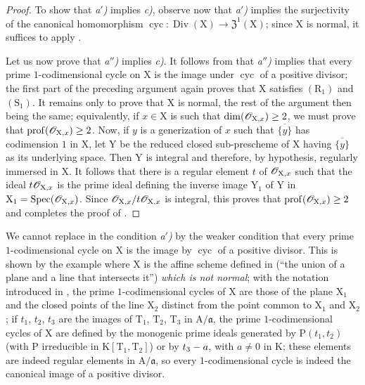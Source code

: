 \begin{proof}
To show that \emph{a$'$)} implies \emph{c)}, observe now that \emph{a$'$)} implies the surjectivity of the canonical homomorphism $\operatorname{cyc}:\operatorname{Div}(\mathrm{X})\to\mathfrak{Z}^1(\mathrm{X})$; since $\mathrm{X}$ is normal, it suffices to apply .

Let us now prove that \emph{a$''$)} implies \emph{c)}.
It follows from  that \emph{a$''$)} implies that every prime $1$-codimensional cycle on $\mathrm{X}$ is the image under $\operatorname{cyc}$ of a positive divisor; the first part of the preceding argument again proves that $\mathrm{X}$ satisfies $(\mathrm{R}_1)$ and $(\mathrm{S}_1)$.
It remains only to prove that $\mathrm{X}$ is normal, the rest of the argument then being the same; equivalently, if $x\in\mathrm{X}$ is such that $\dim(\mathscr{O}_{\mathrm{X},x})\geq 2$, we must prove that $\operatorname{prof}(\mathscr{O}_{\mathrm{X},x})\geq 2$.
Now, if $y$ is a generization of $x$ such that $\overline{\{y\}}$ has codimension $1$ in $\mathrm{X}$, let $\mathrm{Y}$ be the reduced closed sub-prescheme of $\mathrm{X}$ having $\overline{\{y\}}$ as its
underlying space.
Then $\mathrm{Y}$ is integral and therefore, by hypothesis, regularly immersed in $\mathrm{X}$.
It follows that there is a regular element $t$ of $\mathscr{O}_{\mathrm{X},x}$ such that the ideal $t\mathscr{O}_{\mathrm{X},x}$ is the prime ideal defining the inverse image $\mathrm{Y}_1$ of $\mathrm{Y}$ in $\mathrm{X}_1=\operatorname{Spec}(\mathscr{O}_{\mathrm{X},x})$.
Since $\mathscr{O}_{\mathrm{X},x}/t\mathscr{O}_{\mathrm{X},x}$ is integral, this proves that $\operatorname{prof}(\mathscr{O}_{\mathrm{X},x})\geq 2$ and completes the proof of .
\end{proof}

\begin{remark}[21.7.5]
\label{IV.21.7.5}
We cannot replace in  the condition \emph{a$'$)} by the weaker condition that every prime $1$-codimensional cycle on $\mathrm{X}$ is the image by $\operatorname{cyc}$ of a positive divisor.
This is shown by the example where $\mathrm{X}$ is the affine scheme defined in  (``the union of a plane and a line that intersects it'') \emph{which is not normal};
with the notation introduced in , the prime $1$-codimensional cycles of $\mathrm{X}$ are those of the plane $\mathrm{X}_1$ and the closed points of the line $\mathrm{X}_2$ distinct from the point common to $\mathrm{X}_1$ and $\mathrm{X}_2$;
if $t_1$, $t_2$, $t_3$ are the images of $\mathrm{T}_1$, $\mathrm{T}_2$, $\mathrm{T}_3$ in $\mathrm{A}/\mathfrak{a}$, the prime $1$-codimensional cycles of $\mathrm{X}$ are defined by the monogenic prime ideals generated by $\mathrm{P}(t_1,t_2)$ (with $\mathrm{P}$ irreducible in $\mathrm{K}[\mathrm{T}_1,\mathrm{T}_2]$) or by $t_3- a$, with $a\neq 0$ in $\mathrm{K}$;
these elements are indeed regular elements in $\mathrm{A}/\mathfrak{a}$, so every $1$-codimensional cycle is indeed the canonical image of a positive divisor.
\end{remark}

